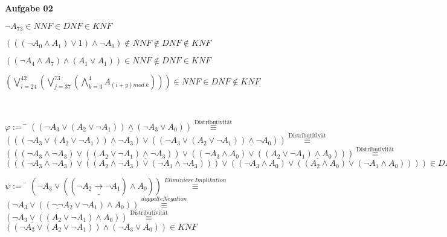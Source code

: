 \documentclass[a4paper,10pt]{article}
\begin{document}
	\textbf{Aufgabe 02}
	\begin{compactenum} [(a)]
		\item 
		\begin{compactenum} [(i)]
			\item $ \lnot A_{73} \in NNF \in DNF \in KNF $
			\item $ (((\lnot A_0 \wedge A_1)\vee 1)\wedge \lnot A_0) \not\in NNF \not\in DNF \not\in KNF$
			\item $ ((\lnot A_4 \wedge A_7)\wedge (A_1 \vee A_1)) \in NNF \not\in DNF \in KNF $
			\item $ (\bigvee\limits_{i = 24}^{42} (\bigvee\limits_{j=37}^{73} (\bigwedge\limits_{k=3}^{4} A_{(i+y) mod\ k}))) \in NNF \in DNF \not\in KNF $
		\end{compactenum} \
		\item \begin{compactitem}
			\item \begin{tabbing}
				$ \varphi := $ 
				\= $ ((\lnot A_3 \vee (A_2 \vee \lnot A_1)) \underline{\wedge} (\lnot A_3 \vee A_0)) \stackrel{\text{Distributivität}}{\equiv} $ \\
				\> $ (((\lnot A_3 \vee (A_2 \vee \lnot A_1))\underline{\wedge} \lnot A_3)\vee ((\lnot A_3 \vee (A_2 \vee \lnot A_1))\underline{\wedge} \lnot A_0)) \stackrel{\text{Distributitivät}}{\equiv}$ \\
				\> $ (((\lnot A_3 \wedge \lnot A_3) \vee ((A_2 \vee \lnot A_1)\underline{\wedge} \lnot A_3))\vee ((\lnot A_3 \wedge A_0)\vee ((A_2 \vee \lnot A_1) \underline{\wedge} A_0))) \stackrel{\text{Distributivität}}{\equiv} $ \\
				\> $ (((\lnot A_3 \wedge \lnot A_3) \vee ((A_2 \wedge \lnot A_3) \vee (\lnot A_1 \wedge \lnot A_3))) \vee ((\lnot A_3 \wedge A_0)\vee((A_2\wedge A_0) \vee (\lnot A_1 \wedge A_0 )))) \in DNF $	
			\end{tabbing}
			\item \begin{tabbing}
				$ \psi :=$
				\= $ (\lnot A_3 \vee ((\lnot A_2 \underline{\rightarrow} \lnot A_1)\wedge A_0)) \stackrel{Eliminiere\ Implikation}{\equiv}$ \\
				\> $ (\lnot A_3 \vee ((\underline{\lnot \lnot} A_2 \vee \lnot A_1)\wedge A_0)) \stackrel{doppelte Negation}{\equiv} $ \\
				\> $ (\lnot A_3 \underline{\vee} ((A_2 \vee \lnot A_1)\wedge A_0)) \stackrel{\text{Distributivität}}{\equiv}$ \\
				\> $ ((\lnot A_3 \vee (A_2 \vee \lnot A_1))\wedge (\lnot A_3 \vee A_0))  \in KNF $

\end{tabbing}
\end{compactitem}
\end{compactenum}
\end{document}
